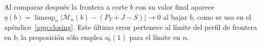 Al comparar después la frontera a corte \(b\) con su valor final aparece
\(\eta(b)=\limsup_n|\mathcal M_n(b)-(P_T+J-S)|\to0\) al bajar \(b\),
como se usa en el apéndice~\ref{app:closing}. Este último error pertenece al límite
del perfil de frontera en \(b\); la proposición sólo emplea \(o_b(1)\) para el límite en \(n\).
